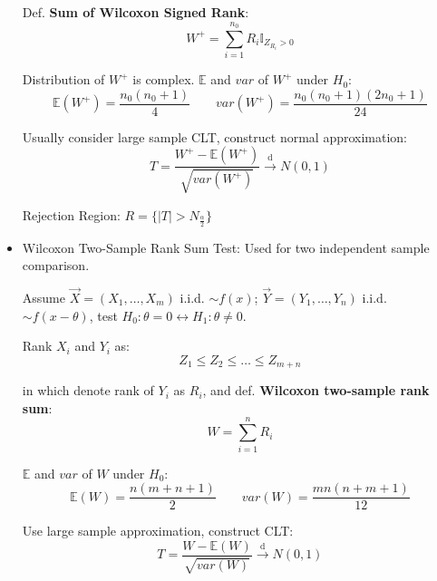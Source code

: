\begin{itemize}
        

        Def. \textbf{Sum of Wilcoxon Signed Rank}: 
        \begin{equation}
        W^+=\sum_{i=1}^{n_0}R_i\mathbb{I}_{Z_{R_i}>0} 
        \end{equation}

        Distribution of $W^+$ is complex. $\mathbb{E}$ and $var$ of $W^+$ under $H_0$:
        \begin{equation}
            \mathbb{E}(W^+)=\frac{n_0(n_0+1)}{4}\qquad var(W^+)=\frac{n_0(n_0+1)(2n_0+1)}{24}    
        \end{equation}

        Usually consider large sample CLT, construct normal approximation:
        \begin{equation}
            T=\frac{W^+-\mathbb{E}(W^+)}{\sqrt{var(W^+)}}\xrightarrow[]{\mathrm{d}}N(0,1)
        \end{equation}

        Rejection Region: $R=\{|T|>N_\frac{\alpha}{2}\}$

        \item Wilcoxon Two-Sample Rank Sum Test: Used for two independent sample comparison.
        
        Assume $\vec{X}=(X_1,\ldots,X_m)$ i.i.d. $\sim f(x)$; $\vec{Y}=(Y_1,\ldots,Y_n)$ i.i.d. $\sim f(x-\theta)$, test $H_0:\theta=0\longleftrightarrow H_1:\theta\neq 0$.

        Rank $X_i$ and $Y_i$ as:
        \begin{equation}
            Z_1\leq Z_2\leq\ldots\leq Z_{m+n}
        \end{equation}

        in which denote rank of $Y_i$ as $R_i$, and def. \textbf{Wilcoxon two-sample rank sum}:
        \begin{equation}W=\sum_{i=1}^n R_i\end{equation}

        $\mathbb{E}$ and $var$ of $W$ under $H_0$:
\begin{equation}\mathbb{E}(W)=\frac{n(m+n+1)}{2}\qquad var(W)=\frac{mn(n+m+1)}{12}\end{equation}

        Use large sample approximation, construct CLT:
        \begin{equation}
            T=\frac{W-\mathbb{E}(W)}{\sqrt{var(W)}}\xrightarrow[]{\mathrm{d}}N(0,1)
        \end{equation}



\end{itemize}
